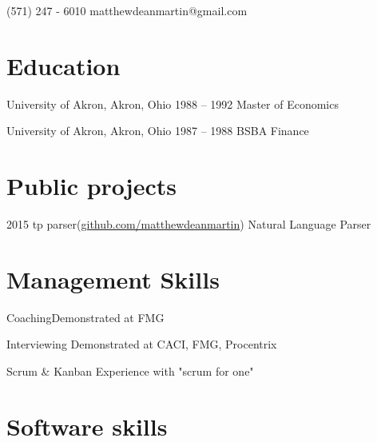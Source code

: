 \documentclass{tccv}
\begin{document}
    {(571) 247 - 6010}
    {matthewdeanmartin@gmail.com}

\section{Education}

\begin{yearlist}

\item[University of Akron,\newline
Akron, Ohio]{1988 -- 1992}
     {Master of Economics}

\item[University of Akron,\newline
Akron, Ohio]{1987 -- 1988}
     {BSBA Finance}


\end{yearlist}

\section{Public projects}

\begin{yearlist}

\item{2015}
     {tp parser(\href{https://github.com/matthewdeanmartin/tokipona.parser/}{github.com/matthewdeanmartin})}
     {Natural Language Parser}

\end{yearlist}

\section{Management Skills}

\begin{factlist}
\item{Coaching}{Demonstrated at FMG}
\item{Interviewing}{ Demonstrated at CACI, FMG, Procentrix }
\item{Scrum \& Kanban}{ Experience with "scrum for one"}
\end{factlist}

\section{Software skills}
\end{document}
